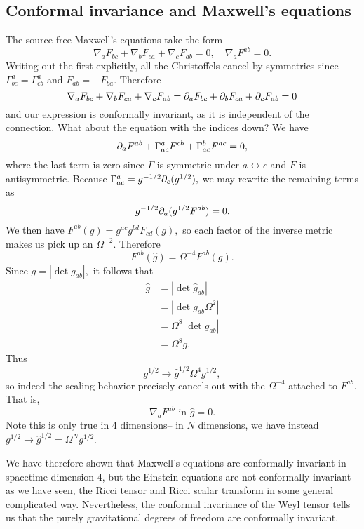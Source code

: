 \subsection*{Conformal invariance and Maxwell's equations} The source-free Maxwell's equations take the form
$$\nabla_a F_{bc}+\nabla_b F_{ca}+\nabla_c F_{ab}=0, \quad \nabla_a F^{ab}=0.$$
Writing out the first explicitly, all the Christoffels cancel by symmetries since $\Gamma^a_{bc}=\Gamma^a_{cb}$ and $F_{ab}=-F_{ba}.$ Therefore 
$$\nabla_a F_{bc}+\nabla_b F_{ca}+\nabla_c F_{ab}= \partial_a F_{bc} + \partial_b F_{ca}+\partial_c F_{ab}=0$$ and our expression is conformally invariant, as it is independent of the connection. What about the equation with the indices down? We have
$$\partial_a F^{ab}+\Gamma^a_{ac} F^{cb}+\Gamma^b_{ac} F^{ac}=0,$$
where the last term is zero since $\Gamma$ is symmetric under $a\leftrightarrow c$ and $F$ is antisymmetric. Because $\Gamma^a_{ac}=g^{-1/2}\partial_c (g^{1/2}),$ we may rewrite the remaining terms as
$$g^{-1/2}\partial_a (g^{1/2}F^{ab})=0.$$
We then have $F^{ab}(g)=g^{ac} g^{bd}F_{cd}(g),$ so each factor of the inverse metric makes us pick up an $\Omega^{-2}$. Therefore
$$F^{ab}(\hat g)=\Omega^{-4}F^{ab}(g).$$
Since $g=|\det g_{ab}|,$ it follows that
\begin{align*}
\hat g&=|\det \hat g_{ab}|\\
&=|\det g_{ab} \Omega^2|\\
&=\Omega^8 |\det g_{ab}|\\
&=\Omega^8 g.
\end{align*}
Thus $$g^{1/2}\to \hat g^{1/2}\Omega^4 g^{1/2},$$ so indeed the scaling behavior precisely cancels out with the $\Omega^{-4}$ attached to $F^{ab}$. That is,
$$\nabla_a F^{ab}\text{ in }\hat g=0.$$
Note this is only true in 4 dimensions-- in $N$ dimensions, we have instead $g^{1/2}\to \hat g^{1/2}=\Omega^N g^{1/2}$.

We have therefore shown that Maxwell's equations are conformally invariant in spacetime dimension $4$, but the Einstein equations are not conformally invariant-- as we have seen, the Ricci tensor and Ricci scalar transform in some general complicated way. Nevertheless, the conformal invariance of the Weyl tensor tells us that the purely gravitational degrees of freedom are conformally invariant.


